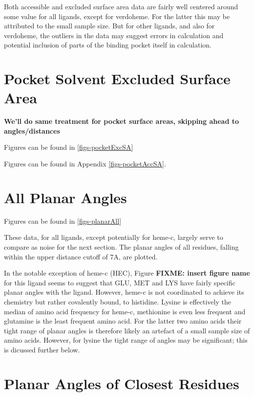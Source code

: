\documentclass[a4paper, nobind]{templates/ociamthesis}
\begin{document}
Both accessible and excluded surface area data are fairly well centered around some value for all ligands, except for verdoheme. For the latter this may be attributed to the small sample size. But for other ligands, and also for verdoheme, the outliers in the data may suggest errors in calculation and potential inclusion of parts of the binding pocket itself in calculation.

\hypertarget{pocket-solvent-excluded-surface-area}{%
\section{Pocket Solvent Excluded Surface Area}\label{pocket-solvent-excluded-surface-area}}

\textbf{We'll do same treatment for pocket surface areas, skipping ahead to angles/distances}

Figures can be found in \ref{figs-pocketExcSA}

Figures can be found in Appendix \ref{figs-pocketAccSA}.

\hypertarget{all-planar-angles}{%
\section{All Planar Angles}\label{all-planar-angles}}

Figures can be found in \ref{figs-planarAll}

These data, for all ligands, except potentially for heme-c, largely serve to compare as noise for the next section. The planar angles of all residues, falling within the upper distance cutoff of 7A, are plotted.

In the notable exception of heme-c (HEC), Figure \textbf{FIXME: insert figure name} for this ligand seems to suggest that GLU, MET and LYS have fairly specific planar angles with the ligand. However, heme-c is not coordinated to achieve its chemistry but rather covalently bound, to histidine. Lysine is effectively the median of amino acid frequency for heme-c, methionine is even less frequent and glutamine is the least frequent amino acid. For the latter two amino acids their tight range of planar angles is therefore likely an artefact of a small sample size of amino acids. However, for lysine the tight range of angles may be significant; this is dicussed further below.

\hypertarget{planar-angles-of-closest-residues}{%
\section{Planar Angles of Closest Residues}\label{planar-angles-of-closest-residues}}
\end{document}

